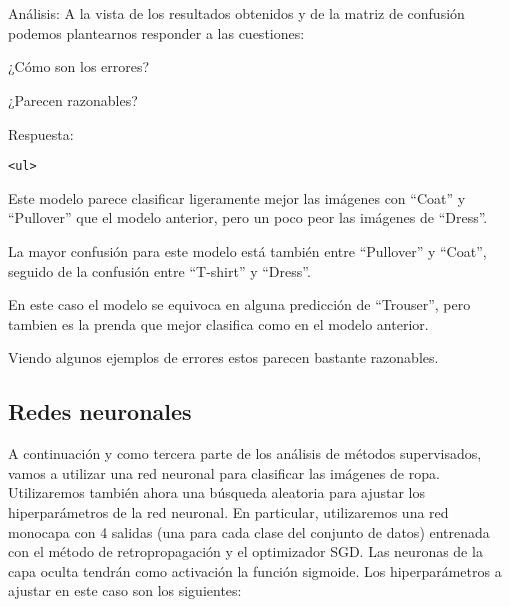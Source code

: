 \documentclass[11pt]{article}
\begin{document}
    \begin{center}
    \end{center}
    { \hspace*{\fill} \\}
    
    \begin{center}
    \end{center}
    { \hspace*{\fill} \\}
    
    Análisis: A la vista de los resultados obtenidos y de la matriz de
confusión podemos plantearnos responder a las cuestiones:

¿Cómo son los errores?

¿Parecen razonables?

    Respuesta:

\begin{verbatim}
<ul>
\end{verbatim}

Este modelo parece clasificar ligeramente mejor las imágenes con
``Coat'' y ``Pullover'' que el modelo anterior, pero un poco peor las
imágenes de ``Dress''.

La mayor confusión para este modelo está también entre ``Pullover'' y
``Coat'', seguido de la confusión entre ``T-shirt'' y ``Dress''.

En este caso el modelo se equivoca en alguna predicción de ``Trouser'',
pero tambien es la prenda que mejor clasifica como en el modelo
anterior.

Viendo algunos ejemplos de errores estos parecen bastante razonables.

    \hypertarget{redes-neuronales}{%
\subsection{Redes neuronales}\label{redes-neuronales}}

A continuación y como tercera parte de los análisis de métodos
supervisados, vamos a utilizar una red neuronal para clasificar las
imágenes de ropa. Utilizaremos también ahora una búsqueda aleatoria para
ajustar los hiperparámetros de la red neuronal. En particular,
utilizaremos una red monocapa con 4 salidas (una para cada clase del
conjunto de datos) entrenada con el método de retropropagación y el
optimizador SGD. Las neuronas de la capa oculta tendrán como activación
la función sigmoide. Los hiperparámetros a ajustar en este caso son los
siguientes:
\end{document}
